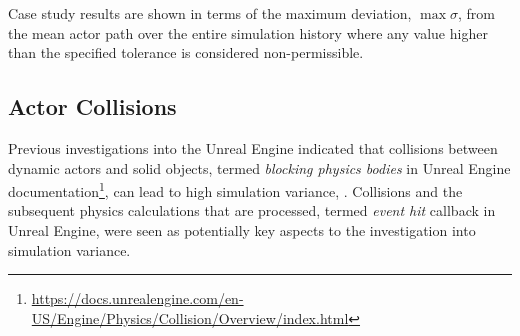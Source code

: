 \documentclass[letterpaper, 10 pt, journal, twoside]{IEEEtran}
\begin{document}
%



Case study results are shown in terms of the maximum deviation, $\max\sigma$, from the mean actor path over the entire simulation history where any value higher than the specified tolerance is considered non-permissible.
%

\subsection{Actor Collisions}\label{S:Actor_Collisions}
Previous investigations into the Unreal Engine indicated that collisions between dynamic actors and solid objects, termed \textit{blocking physics bodies} in Unreal Engine documentation\footnote{\url{https://docs.unrealengine.com/en-US/Engine/Physics/Collision/Overview/index.html}}, can lead to high simulation variance, \cite{TSLUnrealEngineTesting}. 
%
Collisions and the subsequent physics calculations that are processed, termed \textit{event hit} callback in Unreal Engine, were seen as potentially key aspects to the investigation into simulation variance.
\end{document}
